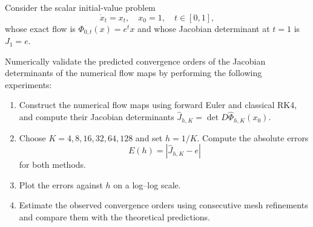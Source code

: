 \documentclass[12pt,a4paper,oneside]{book}
\begin{document}
\begin{Question}

Consider the scalar initial-value problem
\begin{equation*}
    \dot x_t=x_t,\quad x_0=1,\quad t\in[0,1],
\end{equation*}
whose exact flow is $\Phi_{0,t}(x)=e^t x$ and whose Jacobian determinant at $t=1$ is $J_1=e$.

Numerically validate the predicted convergence orders of the Jacobian determinants of the numerical flow maps by performing
the following experiments:

\begin{enumerate}
    \item Construct the numerical flow maps using forward Euler and classical RK4, and compute their Jacobian determinants
        $\widehat J_{h,K}=\det D\widehat\Phi_{h,K}(x_0)$.

    \item Choose $K=4,8,16,32,64,128$ and set $h=1/K$. Compute the absolute errors
        \begin{equation*}
            E(h)=|\widehat J_{h,K}-e|
        \end{equation*}
        for both methods.

    \item Plot the errors against $h$ on a log--log scale.

    \item Estimate the observed convergence orders using consecutive mesh refinements and compare them with the theoretical
        predictions.
\end{enumerate}
\end{Question}
\end{document}
